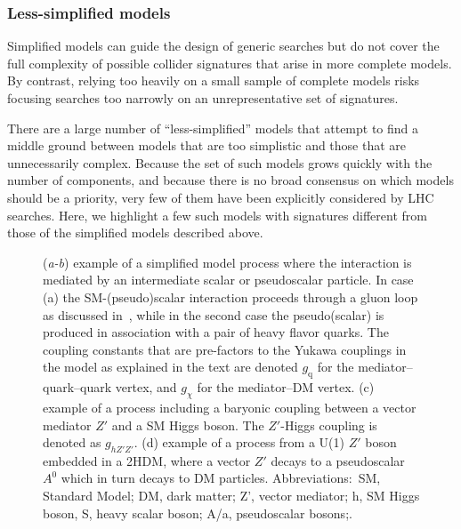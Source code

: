 \documentclass{ar-1col}
\newcommand{\chiDM}{\ensuremath{\chi}\xspace}
\newcommand{\gDM}{\ensuremath{g_{\chiDM}}\xspace}
\newcommand{\gdm}{\gDM}
\newcommand{\gq}{$g_{\mathrm{q}}$\xspace}
\newcommand{\ghZprimeZprime}{\ensuremath{g_{hZ'Z'}}\xspace}
\begin{document}
\subsubsection{Less-simplified models}\label{sec:LessSimplifiedModels}

Simplified models can guide the design of generic searches but do
not cover the full complexity of possible collider signatures that
arise in more complete models. By contrast, relying too
heavily on a small sample of complete models risks focusing
searches too narrowly on an unrepresentative set of signatures.

There are a large number of ``less-simplified'' models that
attempt to find a middle ground between models that are too
simplistic and those that are unnecessarily complex. Because the
set of such models grows quickly with the number of components,
and because there is no broad consensus on which models should be a
priority, very few of them have been explicitly considered by LHC
searches. Here, we highlight a few such models with signatures different from those of
 the simplified models described above.

\begin{figure}[!htpb]
\caption{(\textit{a-b}) example of a simplified model process where the interaction is mediated by an intermediate scalar or pseudoscalar particle. In case (a) the SM-(pseudo)scalar interaction proceeds through a gluon loop as discussed in~\cite{}, while in the second case the pseudo(scalar) is produced in association with a pair of heavy flavor quarks. The coupling constants that are pre-factors to the Yukawa couplings in the model as explained in the text are denoted \gq for the mediator--quark--quark vertex, and \gdm for the mediator--DM vertex. 
(c) example of a process including a baryonic coupling between a vector mediator $Z'$ and a SM Higgs boson. The $Z'$-Higgs coupling is denoted as \ghZprimeZprime. 
(d) example of a process from a U(1) $Z'$ boson embedded in a 2HDM, where a vector $Z'$ decays to a pseudoscalar $A^0$ which in turn decays to DM particles. 
Abbreviations:\ SM, Standard Model; DM, dark matter; Z', vector mediator; h, SM Higgs boson, S, heavy scalar boson; A/a, pseudoscalar bosons;. }
\label{fig:feynman_1}
\end{figure}
\end{document}
